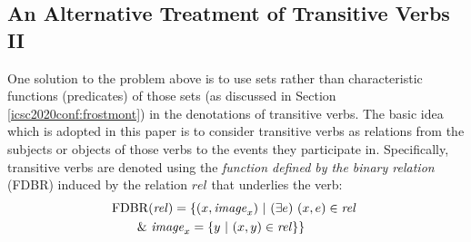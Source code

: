 \documentclass[../main.tex]{subfiles}
\begin{document}
\begin{refsection}
\subsection{An Alternative Treatment of Transitive Verbs II}
\label{icsc2020conf:altvbii}


One solution to the problem above is to use sets rather than characteristic functions (predicates) of those sets (as discussed in Section \ref{icsc2020conf:frostmont}) in the denotations of transitive verbs. The basic idea \cite{frost1989constructing} which is adopted in this paper is to consider transitive verbs as relations from the subjects or objects of those verbs to the events they participate in. 
Specifically, transitive verbs are denoted using the {\em function defined by the binary relation} (FDBR) \cite{peelar2016accommodating} induced by the relation $\mathit{rel}$ that underlies the verb:
\begin{equation*}
	\begin{split}
		&\mathrm{FDBR}({\mathit{rel}}) = \{(x, \mathit{image}_x)\ | \ (\exists e)\ (x, e) \in \mathit{rel}\ \\& \qquad \& \ \mathit{image}_x = \{ y\ |\ (x, y) \in \mathit{rel} \}  \}
	\end{split}
\end{equation*}


\end{refsection}
\end{document}
